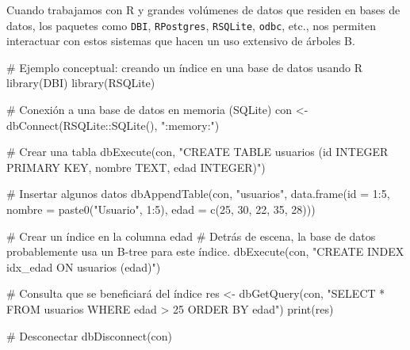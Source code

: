 \documentclass[
  spanish,
  letterpaper,
  DIV=11,
  numbers=noendperiod]{scrreprt}
\newenvironment{Shaded}{\begin{snugshade}}{\end{snugshade}}
\newcommand{\AttributeTok}[1]{\textcolor[rgb]{0.40,0.45,0.13}{#1}}
\newcommand{\CommentTok}[1]{\textcolor[rgb]{0.37,0.37,0.37}{#1}}
\newcommand{\DecValTok}[1]{\textcolor[rgb]{0.68,0.00,0.00}{#1}}
\newcommand{\FunctionTok}[1]{\textcolor[rgb]{0.28,0.35,0.67}{#1}}
\newcommand{\NormalTok}[1]{\textcolor[rgb]{0.00,0.23,0.31}{#1}}
\newcommand{\OtherTok}[1]{\textcolor[rgb]{0.00,0.23,0.31}{#1}}
\newcommand{\SpecialCharTok}[1]{\textcolor[rgb]{0.37,0.37,0.37}{#1}}
\newcommand{\StringTok}[1]{\textcolor[rgb]{0.13,0.47,0.30}{#1}}
\begin{document}
\begin{Shaded}
\end{Shaded}

Cuando trabajamos con R y grandes volúmenes de datos que residen en
bases de datos, los paquetes como \texttt{DBI}, \texttt{RPostgres},
\texttt{RSQLite}, \texttt{odbc}, etc., nos permiten interactuar con
estos sistemas que hacen un uso extensivo de árboles B.

\begin{Shaded}
\begin{Highlighting}[]
\CommentTok{\# Ejemplo conceptual: creando un índice en una base de datos usando R}
\FunctionTok{library}\NormalTok{(DBI)}
\FunctionTok{library}\NormalTok{(RSQLite)}

\CommentTok{\# Conexión a una base de datos en memoria (SQLite)}
\NormalTok{con }\OtherTok{\textless{}{-}} \FunctionTok{dbConnect}\NormalTok{(RSQLite}\SpecialCharTok{::}\FunctionTok{SQLite}\NormalTok{(), }\StringTok{":memory:"}\NormalTok{)}

\CommentTok{\# Crear una tabla}
\FunctionTok{dbExecute}\NormalTok{(con, }\StringTok{"CREATE TABLE usuarios (id INTEGER PRIMARY KEY, nombre TEXT, edad INTEGER)"}\NormalTok{)}

\CommentTok{\# Insertar algunos datos}
\FunctionTok{dbAppendTable}\NormalTok{(con, }\StringTok{"usuarios"}\NormalTok{, }\FunctionTok{data.frame}\NormalTok{(}\AttributeTok{id =} \DecValTok{1}\SpecialCharTok{:}\DecValTok{5}\NormalTok{, }\AttributeTok{nombre =} \FunctionTok{paste0}\NormalTok{(}\StringTok{"Usuario"}\NormalTok{, }\DecValTok{1}\SpecialCharTok{:}\DecValTok{5}\NormalTok{), }\AttributeTok{edad =} \FunctionTok{c}\NormalTok{(}\DecValTok{25}\NormalTok{, }\DecValTok{30}\NormalTok{, }\DecValTok{22}\NormalTok{, }\DecValTok{35}\NormalTok{, }\DecValTok{28}\NormalTok{)))}

\CommentTok{\# Crear un índice en la columna \textquotesingle{}edad\textquotesingle{}}
\CommentTok{\# Detrás de escena, la base de datos probablemente usa un B{-}tree para este índice.}
\FunctionTok{dbExecute}\NormalTok{(con, }\StringTok{"CREATE INDEX idx\_edad ON usuarios (edad)"}\NormalTok{)}

\CommentTok{\# Consulta que se beneficiará del índice}
\NormalTok{res }\OtherTok{\textless{}{-}} \FunctionTok{dbGetQuery}\NormalTok{(con, }\StringTok{"SELECT * FROM usuarios WHERE edad \textgreater{} 25 ORDER BY edad"}\NormalTok{)}
\FunctionTok{print}\NormalTok{(res)}

\CommentTok{\# Desconectar}
\FunctionTok{dbDisconnect}\NormalTok{(con)}
\end{Highlighting}
\end{Shaded}
\end{document}
